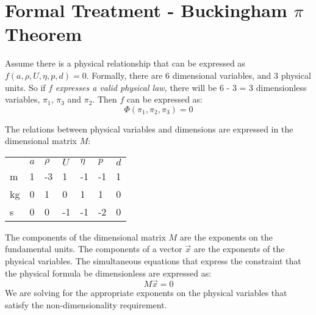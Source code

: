 \documentclass[12pt, a4paper, twoside, openright]{book}
\begin{document}
\pagebreak

\section{Formal Treatment - Buckingham $\pi$ \\ Theorem }

Assume there is a physical relationship that can be expressed as $f(a,\rho ,U,\eta, p, d) = 0 $.
Formally, there are 6 dimensional variables, and 3 physical units.
So if $f$ \emph{expresses a valid physical law,} there will be 
6 - 3 = 3 dimensionless variables, $\pi_1$, $\pi_3$ and $\pi_2$.
Then $f$ can be expressed as:
\begin{equation}
\Phi (\pi_1,\pi_2,\pi_3) = 0
\end{equation}

%
%

The relations between physical variables and dimensions are expressed in the dimensional matrix $M$:

\begin{center}
\begin{tabular}{l l l l l l l }
   & $a$ & $\rho$ & $U$ & $\eta$ & $p$  & $d$ \\
m  & 1   &  -3    &  1  &   -1   &  -1  & 1  \\
kg & 0   &  1     &  0  &    1   &  1   & 0  \\
s  & 0   &  0     &  -1 &   -1   &  -2  & 0  \\
\end{tabular}
\end{center}

The components of the dimensional matrix $M$ are the exponents on the fundamental units.  The components of a vector $\vec{x}$ are the exponents of the physical variables.  The simultaneous equations that express the constraint that the physical formula be dimensionless are expressed as:
\begin{equation}
M \vec{x} = 0
\end{equation}
We are solving for the appropriate exponents on the physical variables that satisfy the non-dimensionality requirement.
\end{document}

